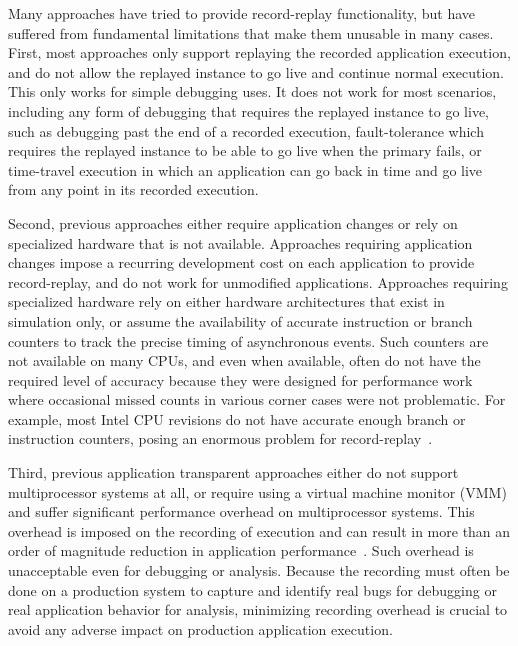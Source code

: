 Many approaches have tried to provide record-replay functionality, but
have suffered from fundamental limitations that make them 
unusable in many cases.  First, most approaches only
support replaying the recorded application execution, and do not allow
the replayed instance to go live and continue normal execution.  This
only works for simple debugging uses.  It does not work for most
scenarios, including any form of debugging that requires the 
replayed instance to go live, such as debugging past the end of a
recorded execution, fault-tolerance which requires the replayed
instance to be able to go live when the primary fails, or time-travel
execution in which an application can go back in time and go live
from any point in its recorded execution.  

Second, previous approaches either require application changes or rely
on specialized hardware that is not available.  Approaches requiring
application changes impose a recurring development cost on each
application to provide record-replay, and do not work for unmodified
applications.  Approaches requiring specialized hardware rely on
either hardware architectures that exist in simulation only, or assume
the availability of accurate instruction or branch counters to track
the precise timing of asynchronous events.  Such counters are not
available on many CPUs, and even when available, often do not have the
required level of accuracy because they were designed for performance
work where occasional missed counts in various corner cases were not
problematic.  For example, most Intel CPU revisions do not have
accurate enough branch or instruction counters, posing an enormous
problem for record-replay~\cite{andytucker}.   

Third, previous application transparent approaches either do not
support multiprocessor systems at all, or require using a virtual
machine monitor (VMM) and suffer significant
performance overhead on multiprocessor systems.   This overhead is
imposed on the recording of execution and can result in more than an
order of magnitude reduction in application
performance~\cite{smp-revirt}. Such
overhead is unacceptable even for debugging or analysis. Because
the recording must often be done on a production system to capture and 
identify real bugs for debugging or real application behavior for
analysis, minimizing recording overhead is
crucial to avoid any adverse impact on production application
execution. 

